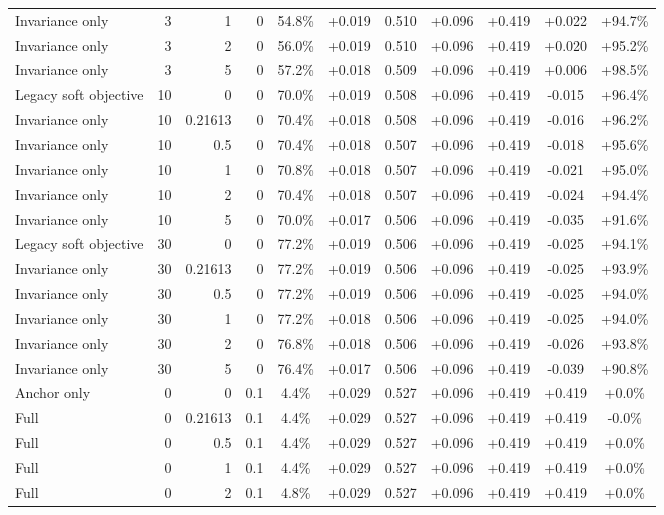 \begin{table}[htbp]
\begin{tabular}{lrrrccccccc}
Invariance only & 3 & 1 & 0 & 54.8\% & +0.019 & 0.510 & +0.096 & +0.419 & +0.022 & +94.7\% \\
Invariance only & 3 & 2 & 0 & 56.0\% & +0.019 & 0.510 & +0.096 & +0.419 & +0.020 & +95.2\% \\
Invariance only & 3 & 5 & 0 & 57.2\% & +0.018 & 0.509 & +0.096 & +0.419 & +0.006 & +98.5\% \\
Legacy soft objective & 10 & 0 & 0 & 70.0\% & +0.019 & 0.508 & +0.096 & +0.419 & -0.015 & +96.4\% \\
Invariance only & 10 & 0.21613 & 0 & 70.4\% & +0.018 & 0.508 & +0.096 & +0.419 & -0.016 & +96.2\% \\
Invariance only & 10 & 0.5 & 0 & 70.4\% & +0.018 & 0.507 & +0.096 & +0.419 & -0.018 & +95.6\% \\
Invariance only & 10 & 1 & 0 & 70.8\% & +0.018 & 0.507 & +0.096 & +0.419 & -0.021 & +95.0\% \\
Invariance only & 10 & 2 & 0 & 70.4\% & +0.018 & 0.507 & +0.096 & +0.419 & -0.024 & +94.4\% \\
Invariance only & 10 & 5 & 0 & 70.0\% & +0.017 & 0.506 & +0.096 & +0.419 & -0.035 & +91.6\% \\
Legacy soft objective & 30 & 0 & 0 & 77.2\% & +0.019 & 0.506 & +0.096 & +0.419 & -0.025 & +94.1\% \\
Invariance only & 30 & 0.21613 & 0 & 77.2\% & +0.019 & 0.506 & +0.096 & +0.419 & -0.025 & +93.9\% \\
Invariance only & 30 & 0.5 & 0 & 77.2\% & +0.019 & 0.506 & +0.096 & +0.419 & -0.025 & +94.0\% \\
Invariance only & 30 & 1 & 0 & 77.2\% & +0.018 & 0.506 & +0.096 & +0.419 & -0.025 & +94.0\% \\
Invariance only & 30 & 2 & 0 & 76.8\% & +0.018 & 0.506 & +0.096 & +0.419 & -0.026 & +93.8\% \\
Invariance only & 30 & 5 & 0 & 76.4\% & +0.017 & 0.506 & +0.096 & +0.419 & -0.039 & +90.8\% \\
Anchor only & 0 & 0 & 0.1 & 4.4\% & +0.029 & 0.527 & +0.096 & +0.419 & +0.419 & +0.0\% \\
Full & 0 & 0.21613 & 0.1 & 4.4\% & +0.029 & 0.527 & +0.096 & +0.419 & +0.419 & -0.0\% \\
Full & 0 & 0.5 & 0.1 & 4.4\% & +0.029 & 0.527 & +0.096 & +0.419 & +0.419 & +0.0\% \\
Full & 0 & 1 & 0.1 & 4.4\% & +0.029 & 0.527 & +0.096 & +0.419 & +0.419 & +0.0\% \\
Full & 0 & 2 & 0.1 & 4.8\% & +0.029 & 0.527 & +0.096 & +0.419 & +0.419 & +0.0\% \\

\end{tabular}
\end{table}

